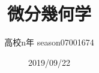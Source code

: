 \documentclass{jsarticle}
\begin{document}
\title{微分幾何学}
\author{高校n年 season07001674}
\date{2019/09/22}
\maketitle
\tableofcontents

\newcommand{\repart}[1]{\part{#1}\setcounter{section}{0}}
\newcommand{\lr}[1]{\left(#1 \right)}
\newcommand{\mlr}[1]{\left\{#1 \right\}}
\newcommand{\llr}[1]{\left[#1 \right]}
\newcommand{\rec}[1]{\frac{1}{#1}}
\newcommand{\di}[2][]{\frac{d #1}{d #2}}
\newcommand{\dd}[2][]{\frac{d^2 #1}{d #2^2}}
\newcommand{\pd}[2][]{\frac{\partial #1}{\partial #2}}
\newcommand{\ppd}[3]{\frac{\partial^2 #1}{\partial #2\partial #3}}
\newcommand{\pmat}[1]{\begin{pmatrix} #1 \end{pmatrix}}
\newcommand{\we}{\wedge}
\newcommand{\gr}{\theta}
\newcommand{\om}{\omega}
\newcommand{\pa}{\partial}
\newcommand{\na}{\nabla}
\newcommand{\Ga}{\Gamma}
\newcommand{\chr}[2]{\left\{#1 \atop #2\right\}}

\end{document}
